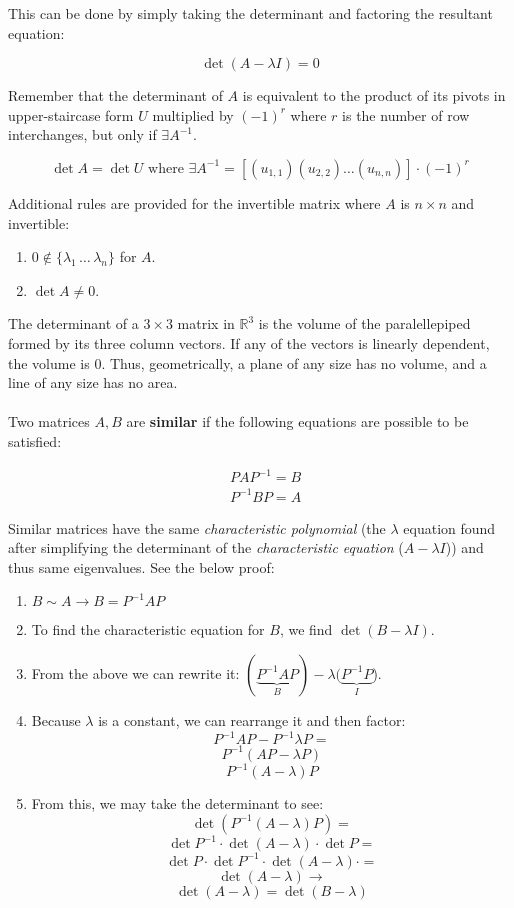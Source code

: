 \documentclass[12pt]{article}
\newcommand{\R}{\mathbb{R}}
\newcommand{\bt}[1]{\textbf{{#1}}}
\newcommand{\set}[1]{\{{#1}\}}
\begin{document}
This can be done by simply taking the determinant and factoring
the resultant equation:

$$\det(A - \lambda I) = 0$$

Remember that the determinant of $A$ is equivalent to the product of its
pivots in upper-staircase form $U$ multiplied by $(-1)^r$ where $r$ is
the number of row interchanges, but only if $\exists A^{-1}$.

$$\det A = \det U \textrm{ where } \exists A^{-1} = [(u_{1,1})(u_{2,2}) \dots (u_{n,n})] \cdot (-1)^r$$

Additional rules are provided for the invertible matrix where $A$ is
$n \times n$ and invertible:

\begin{enumerate}
    \item $0 \notin \set{\lambda_1\, \dots\,\lambda_n}$ for $A$.
    \item $\det A \neq 0$.
\end{enumerate}

The determinant of a $3 \times 3$ matrix in $\R^3$ is the volume of the
paralellepiped formed by its three column vectors. If any of the vectors
is linearly dependent, the volume is $0$. Thus, geometrically, a plane of any size has
no volume, and a line of any size has no area. \\ \\

Two matrices $A, B$ are \bt{similar} if the following equations are
possible to be satisfied:

\begin{align*}
    & PAP^{-1} = B \\
    & P^{-1}BP = A
\end{align*}

Similar matrices have the same \emph{characteristic polynomial} (the
$\lambda$ equation found after simplifying the determinant of the
\emph{characteristic equation} ($A - \lambda I$)) and thus same eigenvalues.
See the below proof:

\begin{enumerate}
    \item $B \sim A \rightarrow B = P^{-1}AP$
    \item To find the characteristic equation for $B$, we find $\det(B - \lambda I)$.
    \item From the above we can rewrite it: $(\underbrace{P^{-1}AP}_{B})
    - \lambda (\underbrace{P^{-1}P}_{I}$).
    \item Because $\lambda$ is a constant, we can rearrange it and then factor:
    $$P^{-1}AP - P^{-1} \lambda P =$$
    $$P^{-1}(AP - \lambda P)$$
    $$P^{-1}(A - \lambda)P$$
    \item From this, we may take the determinant to see:
    $$\det (P^{-1}(A - \lambda)P) =$$
    $$\det P^{-1} \cdot \det (A - \lambda) \cdot \det P =$$
    $$\det P \cdot \det P^{-1} \cdot \det (A - \lambda) \cdot =$$
    $$\det (A - \lambda) \rightarrow$$
    $$\det (A - \lambda) = \det (B - \lambda)$$
\end{enumerate}
\end{document}
